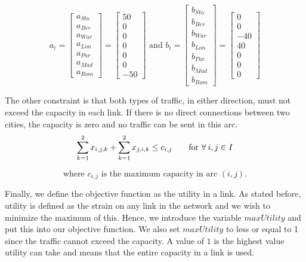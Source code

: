  $$a_{i}= 
 \begin{bmatrix}
  a_{Sto}\\
  a_{Ber}\\
  a_{War}\\
  a_{Lon}\\
  a_{Par}\\
  a_{Mad}\\
  a_{Rom}
 \end{bmatrix} =
 \begin{bmatrix}
  50\\
  0\\
  0\\
  0\\
  0\\
  0\\
  -50
 \end{bmatrix}
 \text{ and }
 b_{i}= 
 \begin{bmatrix}
  b_{Sto}\\
  b_{Ber}\\
  b_{War}\\
  b_{Lon}\\
  b_{Par}\\
  b_{Mad}\\
  b_{Rom}
 \end{bmatrix} =
 \begin{bmatrix}
  0\\
  0\\
  -40\\
  40\\
  0\\
  0\\
  0
 \end{bmatrix}$$


The other constraint is that both types of traffic, in either direction, must not exceed the capacity in each link. If there is no direct connections between two cities, the capacity is zero and no traffic can be sent in this arc.
$$\sum\limits_{k =1}^2 x_{i,j,k} + \sum\limits_{k =1}^2 x_{j,i,k} \leq c_{i,j} \qquad \text{for } \forall \: i,j \in I\\$$

$$
\text{where $c_{i,j}$ is the maximum capacity in arc $(i,j)$.}$$

Finally, we define the objective function as the utility in a link. As stated before, utility is defined as the strain on any link in the network and we wish to minimize the maximum of this. Hence, we introduce the variable $maxUtility$ and put this into our objective function. We also set $maxUtility$ to less or equal to 1 since the traffic cannot exceed the capacity. A value of $1$ is the highest value utility can take and means that the entire capacity in a link is used.

